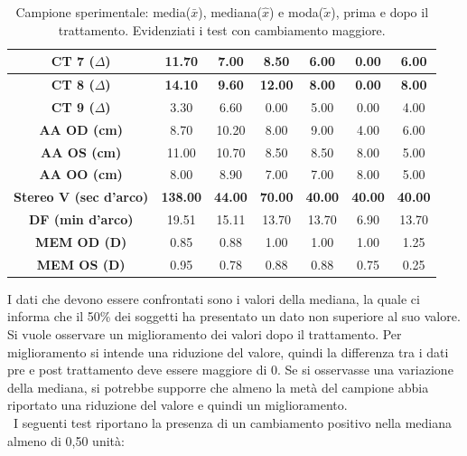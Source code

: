 \begin{table}[H]
\begin{center}
\begin{tabular}{|c|c|c|c|c|c|c|}
\textbf{CT 7 ($\Delta$)} & \textbf{11.70} & \textbf{7.00} & \textbf{8.50} & \textbf{6.00} & \textbf{0.00} & \textbf{6.00} \\ \hline
\textbf{CT 8 ($\Delta$)} & \textbf{14.10} & \textbf{9.60} & \textbf{12.00} & \textbf{8.00} & \textbf{0.00} & \textbf{8.00} \\ \hline
\textbf{CT 9 ($\Delta$)} & 3.30 & 6.60 & 0.00 & 5.00 & 0.00 & 4.00 \\ \hline
\textbf{AA OD (cm)} & 8.70 & 10.20 & 8.00 & 9.00 & 4.00 & 6.00 \\ \hline
\textbf{AA OS (cm)} & 11.00 & 10.70 & 8.50 & 8.50 & 8.00 & 5.00 \\ \hline
\textbf{AA OO (cm)} & 8.00 & 8.90 & 7.00 & 7.00 & 8.00 & 5.00\\ \hline
\textbf{Stereo V (sec d'arco)} & \textbf{138.00} & \textbf{44.00} & \textbf{70.00} & \textbf{40.00} & \textbf{40.00} & \textbf{40.00}\\ \hline
\textbf{DF (min d'arco)} & 19.51 & 15.11 & 13.70 & 13.70 & 6.90 & 13.70 \\ \hline
\textbf{MEM OD (D)} & 0.85 & 0.88 & 1.00 & 1.00 & 1.00 & 1.25 \\ \hline
\textbf{MEM OS (D)} & 0.95 & 0.78 & 0.88 & 0.88 & 0.75 & 0.25 \\ \hline

\hline
\end{tabular}
\end{center}
\caption[Campione sperimentale: $\bar{x}$), ($\hat{x}$), ($\tilde{x}$, prima e dopo il trattamento]{Campione sperimentale: media($\bar{x}$), mediana($\hat{x}$) e moda($\tilde{x}$), prima e dopo il trattamento. Evidenziati i test con cambiamento maggiore.}
\end{table}

I dati che devono essere confrontati sono i valori della mediana, la quale ci informa che il 50\% dei soggetti ha presentato un dato non superiore al suo valore. Si vuole osservare un miglioramento dei valori dopo il trattamento. Per miglioramento si intende una riduzione del valore, quindi la differenza tra i dati pre e post trattamento deve essere maggiore di 0. Se si osservasse una variazione della mediana, si potrebbe supporre che almeno la metà del campione abbia riportato una riduzione del valore e quindi un miglioramento. 
\\\
I seguenti test riportano la presenza di un cambiamento positivo nella mediana almeno di 0,50 unità:

